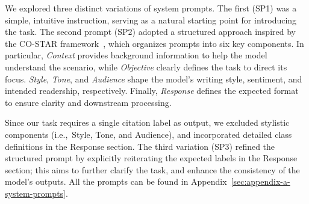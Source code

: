 We explored three distinct variations of system prompts. The first (SP1) was a simple, intuitive instruction, serving as a natural starting point for introducing the task.
The second prompt (SP2) adopted a structured approach inspired by the CO-STAR framework~\citep{costar}, which organizes prompts into six key components. In particular, \textit{Context} provides background information to help the model understand the scenario, while \textit{Objective} clearly defines the task to direct its focus. \textit{Style}, \textit{Tone}, and \textit{Audience} shape the model's writing style, sentiment, and intended readership, respectively. 
Finally, \textit{Response} defines the expected format to ensure clarity and downstream processing.

Since our task requires a single citation label as output, 
we excluded stylistic components (i.e.,~Style, Tone, and Audience),
and incorporated detailed class definitions in the Response section.
The third variation (SP3) refined the structured prompt by explicitly reiterating the expected labels in the Response section; this aims to further clarify the task, and enhance the consistency of the model's outputs. 
All the prompts can be found in Appendix~\ref{sec:appendix-a-system-prompts}.



